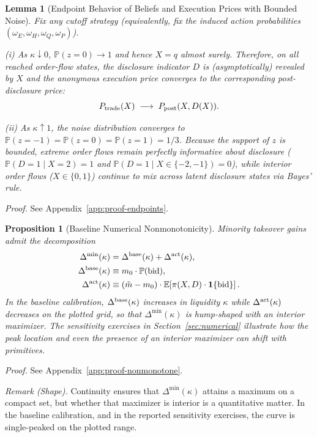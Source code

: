 \documentclass[11pt]{article}
\newtheorem{proposition}{Proposition}
\newtheorem{lemma}{Lemma}
\newcommand{\E}{\mathbb{E}}
\newcommand{\PP}{\mathbb{P}}
\newcommand{\1}{\mathbf{1}}
\begin{document}
\begin{lemma}[Endpoint Behavior of Beliefs and Execution Prices with Bounded Noise]
\label{lem:endpoints}
Fix any cutoff strategy (equivalently, fix the induced action probabilities $(\omega_E,\omega_H,\omega_Q,\omega_P)$).

\textup{(i)} As $\kappa\downarrow 0$, $\PP(z=0)\to 1$ and hence $X=q$ almost surely. Therefore, on all reached order-flow states, the disclosure indicator $D$ is (asymptotically) revealed by $X$ and the anonymous execution price converges to the corresponding post-disclosure price:
\[
P_{\textup{trade}}(X)\;\longrightarrow\;P_{\textup{post}}(X,D(X)).
\]

\textup{(ii)} As $\kappa\uparrow 1$, the noise distribution converges to $\PP(z=-1)=\PP(z=0)=\PP(z=1)=1/3$. Because the support of $z$ is bounded, extreme order flows remain perfectly informative about disclosure ($\PP(D=1\mid X=2)=1$ and $\PP(D=1\mid X\in\{-2,-1\})=0$), while interior order flows ($X\in\{0,1\}$) continue to mix across latent disclosure states via Bayes' rule.
\end{lemma}
\textit{Proof.} See Appendix~\ref{app:proof-endpoints}.

\begin{proposition}[Baseline Numerical Nonmonotonicity]
\label{prop:nonmonotone}
Minority takeover gains admit the decomposition
\begin{align*}
\Delta^{\min}(\kappa)
&=
\Delta^{\textup{base}}(\kappa)
+
\Delta^{\textup{act}}(\kappa),\\
\Delta^{\textup{base}}(\kappa)
&\equiv m_0\cdot \PP(\textup{bid}),\\
\Delta^{\textup{act}}(\kappa)
&\equiv (\tilde m-m_0)\cdot \E\!\left[\pi(X,D)\cdot \1\{\textup{bid}\}\right].
\end{align*}
In the baseline calibration, $\Delta^{\textup{base}}(\kappa)$ increases in liquidity $\kappa$ while $\Delta^{\textup{act}}(\kappa)$ decreases on the plotted grid, so that $\Delta^{\min}(\kappa)$ is hump-shaped with an interior maximizer. The sensitivity exercises in Section~\ref{sec:numerical} illustrate how the peak location and even the presence of an interior maximizer can shift with primitives.
\end{proposition}
\textit{Proof.} See Appendix~\ref{app:proof-nonmonotone}.

\emph{Remark (Shape).} Continuity ensures that $\Delta^{\min}(\kappa)$ attains a maximum on a compact set, but whether that maximizer is interior is a quantitative matter. In the baseline calibration, and in the reported sensitivity exercises, the curve is single-peaked on the plotted range.
\end{document}

